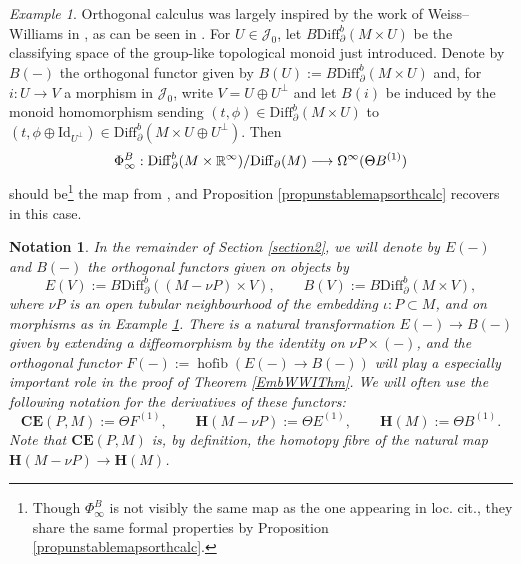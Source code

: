 \documentclass[a4paper, oneside]{amsart}
\newcommand{\diff}{\mathrm{Diff}}
\newcommand{\hofib}{\operatorname{hofib}}
\newcommand{\1}{\mathds{1}}
\newtheorem{notn}[thm]{Notation}
\theoremstyle{remark}
\newtheorem{exm}[thm]{Example}
\theoremstyle{definition}
\newcommand{\R}{{\scaleobj{0.97}{\mathbb{R}}}}
\newcommand{\Hsp}{\mathbf{H}}
\newcommand{\CEsp}{\mathbf{CE}}
\numberwithin{equation}{section}
\begin{document}
\begin{exm}\label{orthexampleWWI}
    Orthogonal calculus was largely inspired by the work of Weiss--Williams in \cite{WWI}, as can be seen in \cite[Digr. 3.8]{WWI}. For $U\in \mathcal J_0$, let $B\diff_\partial^b(M\times U)$ be the classifying space of the group-like topological monoid just introduced. Denote by $B(-)$ the orthogonal functor given by $B(U):=B\diff^b_\partial(M\times U)$ and, for $i: U\to V$ a morphism in $\mathcal J_0$, write $V=U\oplus U^\perp$ and let $B(i)$ be induced by the monoid homomorphism sending $(t,\phi)\in\diff^b_\partial(M\times U)$ to $(t,\phi\oplus\mathrm{Id}_{U^\perp})\in\diff^b_\partial(M\times U\oplus U^\perp)$. Then 
    $$
\Phi^{B}_\infty: \diff^b_\partial(M\times \R^\infty)/\diff_\partial(M)\longrightarrow \Omega^\infty(\Theta B^{(1)})
    $$
    should be\footnote{Though $\Phi^B_\infty$ is not visibly the same map as the one appearing in loc. cit., they share the same formal properties by Proposition \ref{propunstablemapsorthcalc}.} the map from \cite[Thm. C]{WWI}, and Proposition \ref{propunstablemapsorthcalc} recovers \cite[Prop. 3.1]{WWI} in this case.
\end{exm}




\begin{notn}\label{FEBorthfunctorsnotn}
    In the remainder of Section \ref{section2}, we will denote by $E(-)$ and $B(-)$ the orthogonal functors given on objects by
    \begin{equation}\label{functors}
E(V):=B\diff^b_{\partial}((M-\nu P)\times V),\qquad B(V):=B\diff^b_{\partial}(M\times V),
\end{equation}
where $\nu P$ is an open tubular neighbourhood of the embedding $\iota: P\subset M$, and on morphisms as in Example \ref{orthexampleWWI}. There is a natural transformation $E(-)\to B(-)$ given by extending a diffeomorphism by the identity on $\nu P\times (-)$, and the orthogonal functor $F(-):=\hofib(E(-)\to B(-))$ will play a especially important role in the proof of Theorem \ref{EmbWWIThm}. We will often use the following notation for the derivatives of these functors:
\begin{equation}\label{Hspectrumdefn}
\CEsp(P,M):=\Theta F^{(1)}, \qquad \Hsp(M-\nu P):=\Theta E^{(1)}, \qquad \Hsp(M):=\Theta B^{(1)}.
\end{equation}
Note that $\CEsp(P,M)$ is, by definition, the homotopy fibre of the natural map $\Hsp(M-\nu P)\to \Hsp(M)$.
\end{notn}
\end{document}

